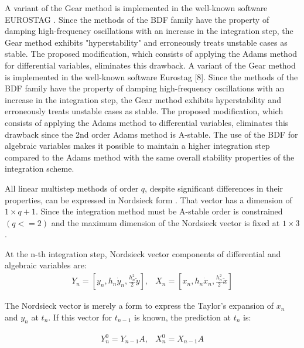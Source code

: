 \documentclass[lettersize,journal]{IEEEtran}
\begin{document}
A variant of the Gear method is implemented in the well-known software EUROSTAG \cite{mixedadams}. Since the methods of the BDF family have the property of damping high-frequency oscillations with an increase in the integration step, the Gear method exhibits "hyperstability" and erroneously treats unstable cases as stable. The proposed modification, which consists of applying the Adams method for differential variables, eliminates this drawback. A variant of the Gear method is implemented in the well-known software Eurostag [8]. Since the methods of the BDF family have the property of damping high-frequency oscillations with an increase in the integration step, the Gear method exhibits hyperstability and erroneously treats unstable cases as stable. The proposed modification, which consists of applying the Adams method to differential variables, eliminates this drawback since the 2nd order Adams method is A-stable. The use of the BDF for algebraic variables makes it possible to maintain a higher integration step compared to the Adams method with the same overall stability properties of the integration scheme.

All linear multistep methods of order \(q\), despite significant differences in their properties, can be expressed in Nordsieck form \cite{hairer93}. That vector has a dimension of \(1 \times q+1\). Since the integration method must be A-stable order is constrained \((q<=2)\) and the maximum dimension of the Nordsieck vector is fixed at \(1 \times 3\). 

At the n-th integration step, Nordsieck vector components of differential and algebraic variables are:
\begin{equation}
	\label{eqn_nords}
	\begin{array}{cc}
		Y_n=\left[y_n, h_n \dot{y}_n, \frac{h_n^2}{2} \ddot{y}\right], &
		X_n=\left[x_n, h_n \dot{x}_n, \frac{h_n^2}{2} \ddot{x}\right] 
	\end{array}
\end{equation}

The Nordsieck vector is merely a form to express the Taylor's expansion of \(x_n\) and \(y_n\) at \(t_n\). If this vector for \(t_{n-1}\) is known, the prediction at \(t_n\) is:

\begin{equation}
	\label{eqn_predictor}
	\begin{array}{cc}
		Y_n^0=Y_{n-1}A, &
		X_n^0=X_{n-1}A
	\end{array}
\end{equation}
\end{document}
